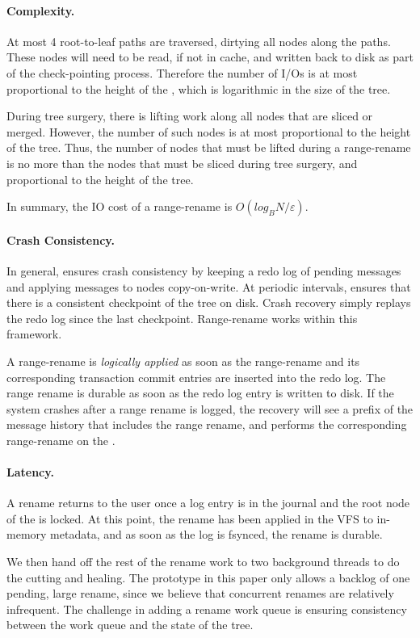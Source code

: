 \paragraph{Complexity.}
At most 4 root-to-leaf paths are traversed, dirtying all nodes along the paths.
These nodes will need to be read, if not in cache, and written back to disk as
part of the check-pointing process.
Therefore the number of I/Os is at most proportional to the height of the \bet,
which is logarithmic in the size of the tree.

During tree surgery, there is lifting work along all nodes that are sliced or
merged.
However, the number of such nodes is at most proportional to the height of the
tree.
Thus, the number of nodes that must be lifted during a range-rename is no more
than the nodes that must be sliced during tree surgery, and proportional to
the height of the tree.

In summary, the IO cost of a range-rename is $O(log_{B}{N}/\varepsilon)$.

\paragraph{Crash Consistency.}
In general, \fti ensures crash consistency by keeping a redo log of pending
messages and applying messages to nodes copy-on-write.
At periodic intervals, \fti ensures that there is a consistent checkpoint
of the tree on disk.
Crash recovery simply replays the redo log since the last checkpoint.
Range-rename works within this framework.

A range-rename is {\em logically applied} as soon as the
range-rename and its corresponding transaction commit entries are inserted into
the redo log.
The range rename is durable as soon as the redo log entry is written to disk.
If the system crashes after a range rename is logged, the recovery will see a
prefix of the message history that includes the range rename,
and performs the corresponding range-rename on the \bet.

\paragraph{Latency.}
A rename returns to the user once a log entry is in the journal and the root
node of the \bet is locked.
At this point, the rename has been applied in the VFS to in-memory metadata,
and as soon as the log is fsynced, the rename is durable.

We then hand off the rest of the rename work to two background threads
to do the cutting and healing.
The prototype in this paper only allows a backlog of one pending, large rename,
since we believe that concurrent renames are relatively infrequent.
The challenge in adding a rename work queue is ensuring consistency between the
work queue and the state of the tree.

